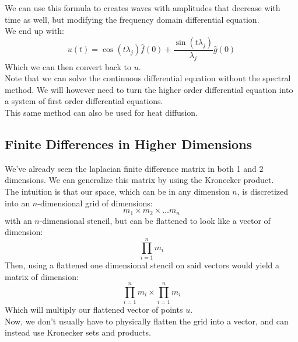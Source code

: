 \documentclass[12pt]{article}
\begin{document}
We can use this formula to creates waves
with amplitudes that decrease with time
as well, but modifying the frequency
domain differential equation. \\

We end up with:
\[ u(t) = \cos(t \lambda_j) \hat{f}(0) 
+ \frac{\sin(t \lambda_j)}{\lambda_j} \hat{g}(0) \]
Which we can then convert back to $u$. \\

Note that we can solve the continuous differential
equation without the spectral method. We will however
need to turn the higher order differential
equation into a system of first order differential
equations. \\

This same method can also be used for heat diffusion. \\

\newpage

\subsection*{Finite Differences in Higher Dimensions}

We've already seen the laplacian
finite difference matrix in both 1 and 2
dimensions. We can generalize this matrix
by using the Kronecker product. \\
The intuition is that our space, which
can be in any dimension $n$,
is discretized into an $n$-dimensional grid
of dimensions:
\[ m_1 \times m_2 \times \dots m_n \] 
with an $n$-dimensional stencil,
but can be flattened to look like a vector
of dimension:
\[ \prod_{i=1}^n m_i \]
Then, using a flattened one dimensional
stencil on said vectors would yield
a matrix of dimension:
\[ \prod_{i=1}^n m_i \times \prod_{i=1}^n m_i \]
Which will multiply our flattened 
vector of points $u$. \\

Now, we don't usually have to physically
flatten the grid into a vector, and can
instead use Kronecker sets
and products. \\
\end{document}
